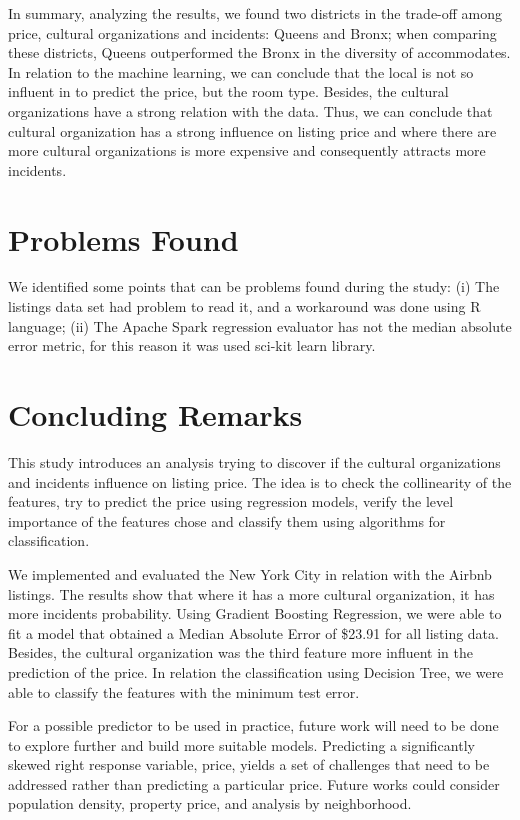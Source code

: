 \documentclass[sigconf]{acmart}
\begin{document}
In summary, analyzing the results, we found two districts in the trade-off among price, cultural organizations and incidents: Queens and Bronx; when comparing these districts, Queens outperformed the Bronx in the diversity of accommodates. In relation to the machine learning, we can conclude that the local is not so influent in to predict the price, but the room type. Besides, the cultural organizations have a strong relation with the data. Thus, we can conclude that cultural organization has a strong influence on listing price and where there are more cultural organizations is more expensive and consequently attracts more incidents.

\section{Problems Found}
\label{sec:problemsfound}

We identified some points that can be problems found during the study: (i) The listings data set had problem to read it, and a workaround was done using R language; (ii) The Apache Spark regression evaluator has not the median absolute error metric, for this reason it was used sci-kit learn library.

\section{Concluding Remarks}
\label{sec:conclusion}

This study introduces an analysis trying to discover if the cultural organizations and incidents influence on listing price. The idea is to check the collinearity of the features, try to predict the price using regression models, verify the level importance of the features chose and classify them using algorithms for classification. 

We implemented and evaluated the New York City in relation with the Airbnb listings. The results show that where it has a more cultural organization, it has more incidents probability. Using Gradient Boosting Regression, we were able to fit a model that obtained a Median Absolute Error of \$23.91 for all listing data. Besides, the cultural organization was the third feature more influent in the prediction of the price. In relation the classification using Decision Tree, we were able to classify the features with the minimum test error.

For a possible predictor to be used in practice, future work will need to be done to explore further and build more suitable models. Predicting a significantly skewed right response variable, price, yields a set of challenges that need to be addressed rather than predicting a particular price. Future works could consider population density, property price, and analysis by neighborhood.

\balance

 
\end{document}
